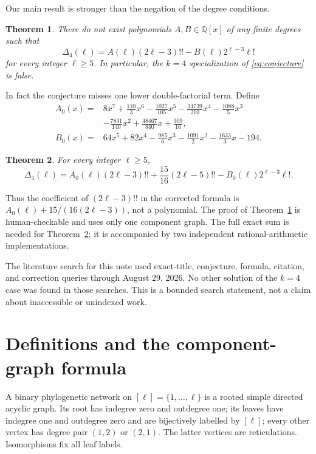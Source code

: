 \documentclass[11pt]{amsart}
\newtheorem{theorem}{Theorem}[section]
\theoremstyle{definition}
\begin{document}
Our main result is stronger than the negation of the degree conditions.

\begin{theorem}\label{thm:main}
There do not exist polynomials $A,B\in\mathbb Q[x]$ of any finite degrees such
that
\[
 \Delta_4(\ell)=A(\ell)(2\ell-3)!!-B(\ell)2^{\ell-3}\ell!
\]
for every integer $\ell\ge5$.  In particular, the $k=4$ specialization of
\eqref{eq:conjecture} is false.
\end{theorem}

In fact the conjecture misses one lower double-factorial term.  Define
\begin{align*}
A_0(x)={}&8x^7+\frac{110}{3}x^6-\frac{1027}{105}x^5
-\frac{34739}{210}x^4-\frac{1088}{5}x^3\\
&-\frac{7831}{140}x^2+\frac{48467}{840}x+\frac{309}{16},\\
B_0(x)={}&64x^5+82x^4-\frac{985}{6}x^3
-\frac{1091}{2}x^2-\frac{1633}{3}x-194.
\end{align*}

\begin{theorem}\label{thm:corrected}
For every integer $\ell\ge5$,
\begin{equation}\label{eq:corrected}
 \Delta_4(\ell)=A_0(\ell)(2\ell-3)!!
 +\frac{15}{16}(2\ell-5)!!
 -B_0(\ell)2^{\ell-3}\ell!.
\end{equation}
\end{theorem}

Thus the coefficient of $(2\ell-3)!!$ in the corrected formula is
$A_0(\ell)+15/(16(2\ell-3))$, not a polynomial.  The proof of
Theorem~\ref{thm:main} is human-checkable and uses only one component graph.
The full exact sum is needed for Theorem~\ref{thm:corrected}; it is accompanied
by two independent rational-arithmetic implementations.

The literature search for this note used exact-title, conjecture, formula,
citation, and correction queries through August 29, 2026.  No other solution
of the $k=4$ case was found in those searches.  This is a bounded search
statement, not a claim about inaccessible or unindexed work.

\section{Definitions and the component-graph formula}

A binary phylogenetic network on $[\ell]=\{1,\dots,\ell\}$ is a rooted simple
directed acyclic graph.  Its root has indegree zero and outdegree one; its
leaves have indegree one and outdegree zero and are bijectively labelled by
$[\ell]$; every other vertex has degree pair $(1,2)$ or $(2,1)$.  The latter
vertices are reticulations.  Isomorphisms fix all leaf labels.
\end{document}

